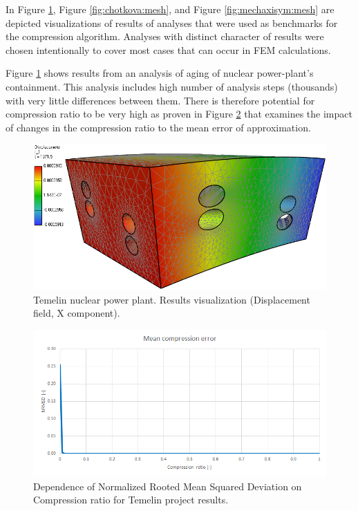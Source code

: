 In Figure \ref{fig:temelin:mesh}, Figure \ref{fig:chotkova:mesh}, and Figure \ref{fig:mechaxisym:mesh} are depicted visualizations of results of analyses that were used as benchmarks for the compression algorithm. Analyses with distinct character of results were chosen intentionally to cover most cases that can occur in FEM calculations.

Figure \ref{fig:temelin:mesh} shows results from an analysis of aging of nuclear power-plant's containment. This analysis includes high number of analysis steps (thousands) with very little differences between them. There is therefore potential for compression ratio to be very high as proven in Figure \ref{fig:temelin:NRMSD} that examines the impact of changes in the compression ratio to the mean error of approximation.

\begin{figure}[H]
\centering\includegraphics[width=\textwidth]{figures/temelin_screenshot}
\caption{Temelin nuclear power plant. Results visualization (Displacement field, X component).}
\label{fig:temelin:mesh}
\end{figure}

\begin{figure}[H]
\centering\includegraphics[width=\textwidth]{figures/temelin_NRMSD}
\caption{Dependence of Normalized Rooted Mean Squared Deviation on Compression ratio for Temelin project results.}
\label{fig:temelin:NRMSD}
\end{figure}

